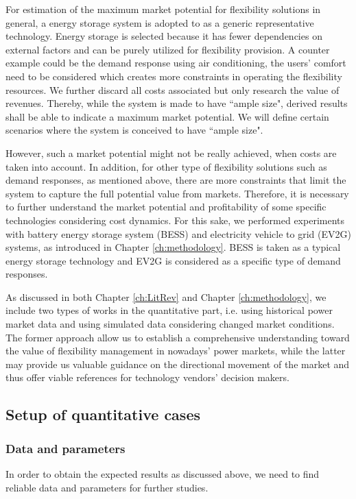 For estimation of the maximum market potential for flexibility solutions in general, a energy storage system is adopted to as a generic representative technology. Energy storage is selected because it has fewer dependencies on external factors and can be purely utilized for flexibility provision. 
A counter example could be the demand response using air conditioning, the users' comfort need to be considered which creates more constraints in operating the flexibility resources. We further discard all costs associated but only research the value of revenues. Thereby, while the system is made to have ``ample size", derived results shall be able to indicate a maximum market potential. We will define certain scenarios where the system is conceived to have ``ample size".

However, such a market potential might not be really achieved, when costs are taken into account. In addition, for other type of flexibility solutions such as demand responses, as mentioned above, there are more constraints that limit the system to capture the full potential value from markets. Therefore, it is necessary to further understand the market potential and profitability of some specific technologies considering cost dynamics. For this sake, we performed experiments with battery energy storage system (BESS) and electricity vehicle to grid (EV2G) systems, as introduced in  Chapter \ref{ch:methodology}. BESS is taken as a typical energy storage technology and EV2G is considered as a specific type of demand responses. 

As discussed in both Chapter \ref{ch:LitRev} and Chapter \ref{ch:methodology}, we include two types of works in the quantitative part, i.e. using historical power market data and using simulated data considering changed market conditions. The former approach allow us to establish a comprehensive understanding toward the value of flexibility management in nowadays' power markets, while the latter may provide us valuable guidance on the directional movement of the market and thus offer viable references for technology vendors' decision makers.

\subsection{Setup of quantitative cases}
\subsubsection{Data and parameters}
\label{sec:data-parameter}
In order to obtain the expected results as discussed above, we need to find reliable data and parameters for further studies.

